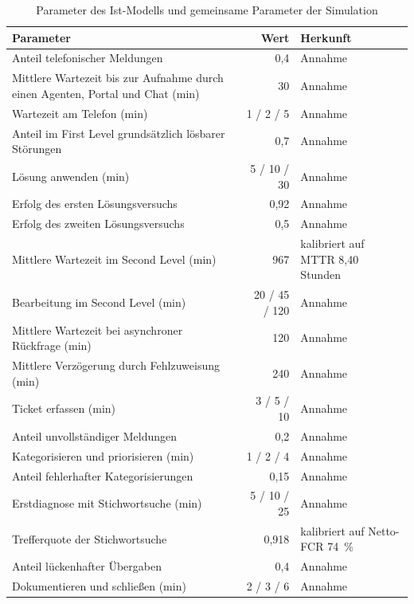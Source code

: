 \begin{table}[!htb]
	\centering
	\caption{Parameter des Ist-Modells und gemeinsame Parameter der Simulation}
	\label{tab:parameterIst}
	\small
	\begin{tabularx}{\textwidth}{@{}>{\raggedright\arraybackslash}Xr>{\raggedright\arraybackslash}p{4.6cm}@{}}
		\toprule
		Parameter & Wert & Herkunft \\
		\midrule
		Anteil telefonischer Meldungen & 0,4 & Annahme \\
		Mittlere Wartezeit bis zur Aufnahme durch einen Agenten, Portal und Chat (min) & 30 & Annahme \\
		Wartezeit am Telefon (min) & 1 / 2 / 5 & Annahme \\
		Anteil im First Level grunds\"atzlich l\"osbarer St\"orungen & 0,7 & Annahme \\
		L\"osung anwenden (min) & 5 / 10 / 30 & Annahme \\
		Erfolg des ersten L\"osungsversuchs & 0,92 & Annahme \\
		Erfolg des zweiten L\"osungsversuchs & 0,5 & Annahme \\
		Mittlere Wartezeit im Second Level (min) & 967 & kalibriert auf MTTR 8,40 Stunden \\
		Bearbeitung im Second Level (min) & 20 / 45 / 120 & Annahme \\
		Mittlere Wartezeit bei asynchroner R\"uckfrage (min) & 120 & Annahme \\
		Mittlere Verz\"ogerung durch Fehlzuweisung (min) & 240 & Annahme \\
		Ticket erfassen (min) & 3 / 5 / 10 & Annahme \\
		Anteil unvollst\"andiger Meldungen & 0,2 & Annahme \\
		Kategorisieren und priorisieren (min) & 1 / 2 / 4 & Annahme \\
		Anteil fehlerhafter Kategorisierungen & 0,15 & Annahme \\
		Erstdiagnose mit Stichwortsuche (min) & 5 / 10 / 25 & Annahme \\
		Trefferquote der Stichwortsuche & 0,918 & kalibriert auf Netto-FCR 74~\% \\
		Anteil l\"uckenhafter \"Ubergaben & 0,4 & Annahme \\
		Dokumentieren und schlie{\ss}en (min) & 2 / 3 / 6 & Annahme \\
		\bottomrule
	\end{tabularx}
\end{table}

